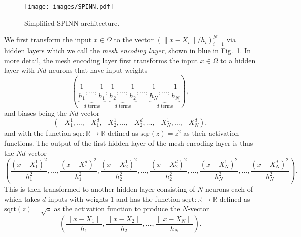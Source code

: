 \documentclass[12pt]{article}
\begin{document}
\begin{figure}
\centering
\texttt{[image: images/SPINN.pdf]}
\caption{Simplified SPINN architecture.}
\label{fig:meshless_nn_repr}
\end{figure}

We first transform the input  $x \in \Omega$ to the vector $(\lVert x - X_i\rVert/h_i)_{i=1}^N$ via hidden layers which we call the \emph{mesh encoding layer}, shown in blue in Fig.~\ref{fig:meshless_nn_repr}. In more detail, the mesh encoding layer first transforms the input $x \in \Omega$ to a hidden layer with $Nd$ neurons that have input weights
\begin{displaymath}
\left(\underbrace{\frac{1}{h_1}, \ldots, \frac{1}{h_1}}_{\text{$d$ terms}}, \underbrace{\frac{1}{h_2}, \ldots, \frac{1}{h_2}}_{\text{$d$ terms}}, \ldots, \underbrace{\frac{1}{h_N}, \ldots, \frac{1}{h_N}}_{\text{$d$ terms}} \right),
\end{displaymath}
and biases being the $Nd$ vector
\begin{displaymath}
(-X_1^1, \ldots, -X_1^d, -X_2^1, \ldots, -X_2^d, \ldots, -X_N^1, \ldots, -X_N^d),
\end{displaymath}
and with the function $\text{sqr}:\mathbb{R} \to \mathbb{R}$ defined as $\text{sqr}(z) = z^2$ as their activation functions. The output of the first hidden layer of the mesh encoding layer is thus the $Nd$-vector
\begin{displaymath}
\left(\frac{(x - X_1^1)^2}{h_1^2}, \ldots, \frac{(x - X_1^d)^2}{h_1^2}, \frac{(x - X_2^1)^2}{h_2^2}, \ldots, \frac{(x - X_2^d)^2}{h_2^2}, \ldots, \frac{(x - X_N^1)^2}{h_N^2}, \ldots, \frac{(x - X_N^d)^2}{h_N^2}\right).
\end{displaymath}
This is then transformed to another hidden layer consisting of $N$ neurons each of which takes $d$ inputs with weights $1$ and has the function $\text{sqrt}:\mathbb{R} \to \mathbb{R}$ defined as $\text{sqrt}(z) = \sqrt{z}$ as the activation function to produce the $N$-vector
\begin{displaymath}
\left(\frac{\lVert x - X_1\rVert}{h_1}, \frac{\lVert x - X_2\rVert}{h_2}, \ldots, \frac{\lVert x - X_N\rVert}{h_N}\right).
\end{displaymath}
\end{document}
